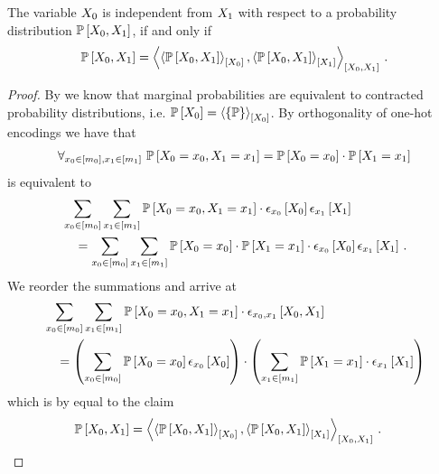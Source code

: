 \begin{theorem}
    \label{the:independenceProductCriterion}
    The variable $X_{0}$ is independent from $X_{1}$ with respect to a probability distribution $\mathbb{P}\left[X_{0},X_{1}\right]$, if and only if
    \begin{align*}
        \mathbb{P}\left[X_{0},X_{1}\right]
        = \left\langle \left\langle \mathbb{P}\left[X_{0},X_{1}\right]\right\rangle_{\left[ X_{0} \right]},\left\langle \mathbb{P}\left[X_{0},X_{1}\right]\right\rangle_{\left[ X_{1} \right]}\right\rangle_{\left[ X_{0},X_{1} \right]} \, .
    \end{align*}
\end{theorem}
\begin{proof}
    By  we know that marginal probabilities are equivalent to contracted probability distributions, i.e. $\mathbb{P}\left[X_{0}\right] = \left\langle \{\mathbb{P}\}\right\rangle_{\left[ X_{0} \right]} $.
    By orthogonality of one-hot encodings we have that
    \begin{align*}
        \forall_{x_{0}\in[m_{0}],x_{1}\in[m_{1}]} \,\, {
            \mathbb{P}\left[X_{0}=x_{0},X_{1}=x_{1}\right] = \mathbb{P}\left[X_{0}=x_{0}\right]\cdot\mathbb{P}\left[X_{1}=x_{1}\right]
        }
    \end{align*}
    is equivalent to
    \begin{align*}
        &\sum_{x_{0}\in[m_{0}]}\sum_{x_{1}\in[m_{1}]} \mathbb{P}\left[X_{0}=x_{0},X_{1}=x_{1}\right] \cdot \epsilon_{x_{0}}\left[X_{0}\right]\epsilon_{x_{1}}\left[X_{1}\right] \\
        &\quad = \sum_{x_{0}\in[m_{0}]}\sum_{x_{1}\in[m_{1}]}
        \mathbb{P}\left[X_{0}=x_{0}\right]
        \cdot
        \mathbb{P}\left[X_{1}=x_{1}\right] \cdot \epsilon_{x_{0}}\left[X_{0}\right]\epsilon_{x_{1}}\left[X_{1}\right] \, .
    \end{align*}
    We reorder the summations and arrive at
    \begin{align*}
        & \sum_{x_{0}\in[m_{0}]}\sum_{x_{1}\in[m_{1}]}
        \mathbb{P}\left[X_{0}=x_{0},X_{1}=x_{1}\right] \cdot \epsilon_{x_{0},x_{1}}\left[X_{0}, X_{1}\right] \\
        &\quad = \left(\sum_{x_{0}\in[m_{0}]}\mathbb{P}\left[X_{0}=x_{0}\right] \epsilon_{x_{0}}\left[X_{0}\right] \right)
        \cdot
        \left( \sum_{x_{1}\in[m_{1}]}  \mathbb{P}\left[X_{1}=x_{1}\right] \cdot \epsilon_{x_{1}}\left[X_{1}\right]  \right)
    \end{align*}
    which is by  equal to the claim
    \begin{align*}
        \mathbb{P}\left[X_{0},X_{1}\right]
        = \left\langle \left\langle \mathbb{P}\left[X_{0},X_{1}\right]\right\rangle_{\left[ X_{0} \right]},\left\langle \mathbb{P}\left[X_{0},X_{1}\right]\right\rangle_{\left[ X_{1} \right]}\right\rangle_{\left[ X_{0},X_{1} \right]} \, . & \qedhere
    \end{align*}
\end{proof}

